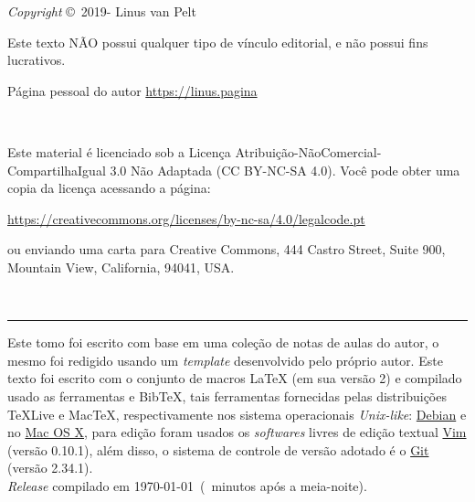 \begingroup

\newpage
\thispagestyle{empty}

\noindent \textit{Copyright} \copyright\ 2019-{\the\year} Linus van Pelt

\noindent Este texto  \textsc{NÃO}  possui qualquer tipo de vínculo editorial, e não possui fins lucrativos.

\noindent Página pessoal do autor \url{https://linus.pagina}

~\vfill

\thispagestyle{empty}

\noindent Este material é licenciado sob a Licença Atribuição-NãoComercial-CompartilhaIgual 3.0 Não Adaptada (CC BY-NC-SA 4.0).  Você pode obter uma copia da licença acessando a página: 
\begin{center}
	\url{https://creativecommons.org/licenses/by-nc-sa/4.0/legalcode.pt}
\end{center}
\noindent ou enviando uma carta para Creative Commons, 444 Castro Street, Suite 900, Mountain View, California, 94041, USA.

~\vfill

\hrule
\vspace*{1cm}

\noindent Este tomo foi escrito com base em uma coleção de notas de aulas do autor, o mesmo foi redigido usando um \textit{template} desenvolvido pelo próprio autor. Este texto foi escrito com o conjunto de macros {\LaTeX} (em sua versão 2) e compilado usado as ferramentas {\LuaLaTeX} e {Bib\TeX}, tais ferramentas fornecidas pelas distribuições {\TeX}Live e Mac{\TeX}, respectivamente  nos sistema operacionais \textit{Unix-like}: \href{https://debian.org}{Debian} e no \href{https://support.apple.com/pt-br/102662}{Mac OS X}, para edição foram usados os \textit{softwares} livres  de edição textual \href{https://www.vim.org/}{Vim} (versão 0.10.1), além disso, o sistema de controle de versão adotado é o \href{https://git-scm.com/}{Git} (versão 2.34.1). \\ 

\noindent \textit{Release} compilado em \today\ (\MinutesAfterMidnight\ minutos após a meia-noite). %

\endgroup